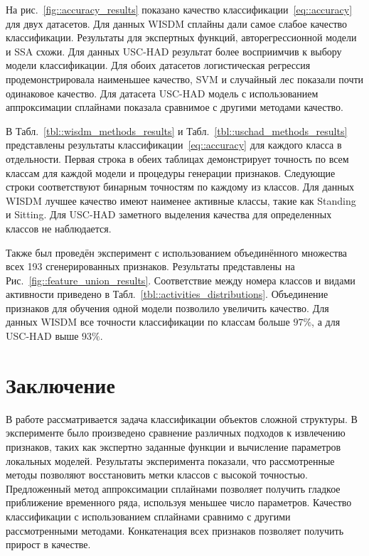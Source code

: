 \documentclass{llncs}
\begin{document}
На рис.~\ref{fig::accuracy_results} показано качество классификации~\eqref{eq::accuracy} для двух датасетов.
Для данных WISDM сплайны дали самое слабое качество классификации.
Результаты для экспертных функций, авторегрессионной модели и SSA схожи.
Для данных USC-HAD результат более восприимчив к выбору модели классификации. 
Для обоих датасетов логистическая регрессия продемонстрировала наименьшее качество, SVM и случайный лес показали почти одинаковое качество.
Для датасета USC-HAD модель с использованием аппроксимации сплайнами
показала сравнимое с другими методами качество. 

В Табл.~\ref{tbl::wisdm_methods_results} и Табл.~\ref{tbl::uschad_methods_results} представлены результаты классификации~\eqref{eq::accuracy} для каждого класса в отдельности.
Первая строка в обеих таблицах демонстрирует точность по всем классам для каждой модели и процедуры генерации признаков.
Следующие строки соответствуют бинарным точностям по каждому из классов.
Для данных WISDM лучшее качество имеют наименее активные классы, такие как Standing и Sitting. 
Для USC-HAD заметного выделения качества для определенных классов не наблюдается.

Также был проведён эксперимент с использованием объединённого множества всех 193 сгенерированных признаков.
Результаты представлены на Рис.~\ref{fig::feature_union_results}. Соответствие между номера классов и видами активности приведено в Табл.~\ref{tbl::activities_distributions}. 
Объединение признаков для обучения одной модели позволило увеличить качество. 
Для данных WISDM все точности классификации по классам больше $97 \%$, а для USC-HAD выше $93 \%$.

\section{Заключение}
В работе рассматривается задача классификации объектов сложной структуры.
В эксперименте было произведено сравнение различных подходов к извлечению признаков, таких как экспертно заданные функции и вычисление параметров локальных моделей.
Результаты эксперимента показали, что рассмотренные методы позволяют восстановить метки классов с высокой точностью.
Предложенный метод аппроксимации сплайнами позволяет получить гладкое приближение временного ряда, используя меньшее число параметров.
Качество классификации с использованием сплайнами сравнимо с другими рассмотренными методами.
Конкатенация всех признаков позволяет получить прирост в качестве.


\end{document}
